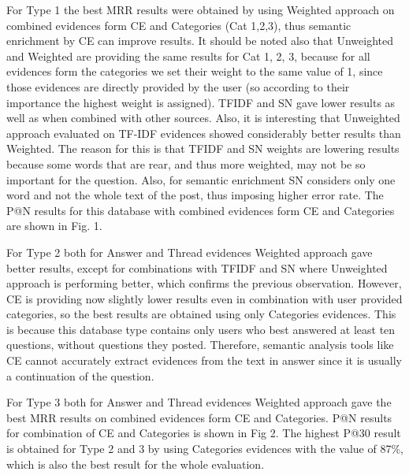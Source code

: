 \documentclass[conference]{IEEEtran}
\begin{document}
For Type 1 the best MRR results were obtained by using Weighted approach on combined evidences form CE and Categories (Cat 1,2,3), thus semantic enrichment by CE can improve results. It should be noted also that Unweighted and Weighted are providing the same results for Cat 1, 2, 3, because for all evidences form the categories we set their weight to the same value of 1, since those evidences are directly provided by the user (so according to their importance the highest weight is assigned). TFIDF and SN gave lower results as well as when combined with other sources. Also, it is interesting that Unweighted approach evaluated on TF-IDF evidences showed considerably better results than Weighted. The reason for this is that TFIDF and SN weights are lowering results because some words that are rear, and thus more weighted, may not be so important for the question. Also, for semantic enrichment SN considers only one word and not the whole text of the post, thus imposing higher error rate. The P@N results for this database with combined evidences form CE and Categories are shown in Fig. 1.

For Type 2 both for Answer and Thread evidences Weighted approach gave better results, except for combinations with TFIDF and SN where Unweighted approach is performing better, which confirms the previous observation.  However, CE is providing now slightly lower results even in combination with user provided categories, so the best results are obtained using only Categories evidences. This is because this database type contains only users who best answered at least ten questions, without questions they posted.  Therefore, semantic analysis tools like CE cannot accurately extract evidences from the text in answer since it is usually a continuation of the question.

For Type 3 both for Answer and Thread evidences Weighted approach gave the best MRR results on combined evidences form CE and Categories. P@N results for combination of CE and Categories is shown in Fig 2. The highest P@30 result is obtained for Type 2 and 3 by using Categories evidences with the value of 87\%, which is also the best result for the whole evaluation.
\end{document}
